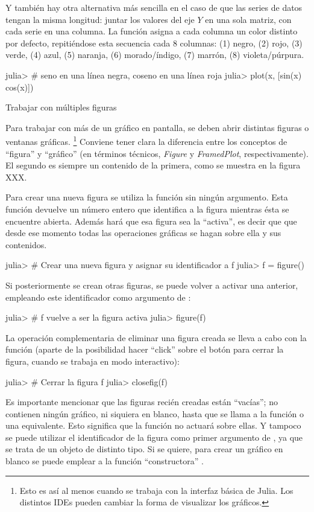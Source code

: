 ﻿\documentclass[spanish]{article}
\begin{document}
Y también hay otra alternativa más sencilla en el caso de que las series de datos tengan la misma longitud: juntar los valores del eje $Y$ en una sola matriz, con cada serie en una columna. La función  asigna a cada columna un color distinto por defecto, repitiéndose esta secuencia cada 8 columnas: (1) negro, (2) rojo, (3) verde, (4) azul, (5) naranja, (6) morado/índigo, (7) marrón, (8) violeta/púrpura.

julia> # seno en una línea negra, coseno en una línea roja
julia> plot(x, [sin(x) cos(x)])


Trabajar con múltiples figuras

Para trabajar con más de un gráfico en pantalla, se deben abrir distintas figuras o ventanas gráficas.%
\footnote{%
Esto es así al menos cuando se trabaja con la interfaz básica de Julia. Los distintos IDEs pueden cambiar la forma de visualizar los gráficos.%
}
Conviene tener clara la diferencia entre los conceptos de ``figura'' y ``gráfico'' (en términos técnicos, \emph{Figure} y \emph{FramedPlot}, respectivamente). El segundo es siempre un contenido de la primera, como se muestra en la figura XXX.

Para crear una nueva figura se utiliza la función  sin ningún argumento. Esta función devuelve un número entero que identifica a la figura mientras ésta se encuentre abierta. Además hará que esa figura sea la ``activa'', es decir que que desde ese momento todas las operaciones gráficas se hagan sobre ella y sus contenidos.

julia> # Crear una nueva figura y asignar su identificador a f
julia> f = figure()

Si posteriormente se crean otras figuras, se puede volver a activar una anterior, empleando este identificador como argumento de :

julia> # f vuelve a ser la figura activa
julia> figure(f)

La operación complementaria de eliminar una figura creada se lleva a cabo con la función  (aparte de la posibilidad hacer ``click'' sobre el botón para cerrar la figura, cuando se trabaja en modo interactivo):

julia> # Cerrar la figura f
julia> closefig(f)

Es importante mencionar que las figuras recién creadas están ``vacías''; no contienen ningún gráfico, ni siquiera en blanco, hasta que se llama a la función  o una equivalente. Esto significa que la función  no actuará sobre ellas. Y tampoco se puede utilizar el identificador de la figura como primer argumento de , ya que se trata de un objeto de distinto tipo. Si se quiere, para crear un gráfico en blanco se puede emplear a la función ``constructora'' .
\end{document}
